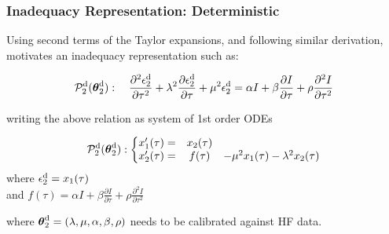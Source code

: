 \documentclass[10pt,xcolor=dvipsnames,compress]{beamer}
\begin{document}
\begin{frame}
\frametitle{Inadequacy Representation: Deterministic}
\vfill


Using second terms of the Taylor expansions, and following similar derivation, motivates an inadequacy representation such as:

\begin{problock}{}

\begin{equation*}
\mathcal{P}_2^{\rm d}(\boldsymbol{\theta}_2^{\rm d}) : \quad
\frac{\partial^2\epsilon_2^{\rm d}}{\partial\tau^2} + \lambda^2\frac{\partial\epsilon_2^{\rm d}}{\partial\tau} + \mu^2\epsilon_2
^{\rm d} =  \alpha I + \beta \frac{\partial I}{\partial\tau} + 
\rho \frac{\partial^2 I}{\partial\tau^2}
\end{equation*}

\end{problock}

writing the above relation as system of 1st order ODEs

\begin{problock}{}

\begin{equation*}
\mathcal{P}_2^{\rm d}(\boldsymbol{\theta}_2^{\rm d}) :\left\{\begin{matrix}
 x_1'(\tau) = & x_2(\tau) &\\ 
x_2'(\tau) = & f(\tau) &-\mu^2 x_1(\tau) - \lambda^2 x_2(\tau)
\end{matrix}\right.
\end{equation*}
where $\epsilon_2^{\rm d} = x_1(\tau)$ \\
and
$f(\tau) = \alpha I + \beta \frac{\partial I}{\partial \tau} + \rho \frac{\partial^2 I}{\partial \tau^2}$

where $
\boldsymbol{\theta}_2^{\rm d}=
(\lambda, \mu, \alpha, \beta, \rho)
$ needs to be calibrated against HF data.

\end{problock}


\vfill
\end{frame}
\end{document}
